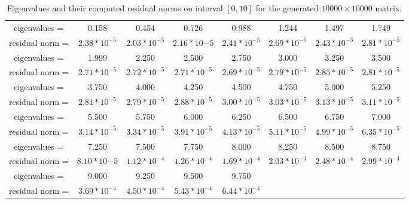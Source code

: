 \begin{table*}
\begin{center}
\begin{tabular}{|c|c|c|c|c|c|c|c|}
\hline
eigenvalues =  & 0.158 & 0.454 & 0.726& 0.988 &1.244 &1.497& 1.749 \\ 
residual norm =  & $2.38*10^{-5}$ & $2.03*10^{-5}$ & $2.16*10{-5}$ & $2.41*10^{-5}$ & $2.69*10^{-5}$ & $2.43*10^{-5}$ & $2.81*10^{-5}$\\
\hline
\hline
eigenvalues = &1.999 & 2.250 & 2.500 & 2.750 & 3.000& 3.250& 3.500\\
residual norm =  &$2.71*10^{-5}$ & $2.72*10^{-5}$& $2.71*10^{-5}$ &$2.69*10^{-5}$ & $2.79*10^{-5}$ &$2.85*10^{-5}$&  $2.81*10^{-5}$ \\
\hline
\hline
eigenvalues = &3.750 & 4.000 &4.250 & 4.500 & 4.750 & 5.000 & 5.250 \\
residual norm =  &$2.81*10^{-5}$ & $2.79*10^{-5}$ & $2.88*10^{-5}$ & $3.00*10^{-5}$ & $3.03*10^{-5}$ & $3.13*10^{-5}$ &$3.11*10^{-5}$ \\
\hline
\hline
eigenvalues = &  5.500  & 5.750  & 6.000  & 6.250 & 6.500 & 6.750 & 7.000\\
residual norm = & $3.14*10^{-5}$ &$3.34*10^{-5}$ & $3.91*10^{-5}$ & $4.13*10^{-5}$ & $5.11*10^{-5}$ & $4.99*10^{-5}$ & $6.35*10^{-5}$ \\
\hline
\hline
eigenvalues =  & 7.250 & 7.500 & 7.750 & 8.000 & 8.250 & 8.500 & 8.750   \\
residual norm = & $8.10*10{-5}$ & $1.12*10^{-4}$ & $1.26*10^{-4}$ & $1.69*10^{-4}$ & $2.03*10^{-4}$ & $2.48*10^{-4}$&  $2.99*10^{-4}$ \\
\hline
\hline
eigenvalues =  & 9.000 & 9.250 & 9.500 & 9.750 &&&\\
residual norm = & $3.69*10^{-4}$ &$4.50*10^{-4}$ & $5.43*10^{-4}$ & $6.44*10^{-4}$&&&\\
\hline
\end{tabular}
\caption{Eigenvalues and their computed residual norms on interval $[0, 10]$ for the generated $10000 \times 10000$ matrix.}
\label{tab:eigs}
\end{center}
\end{table*}

